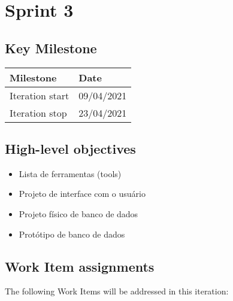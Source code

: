 \clearpage
\section{Sprint 3}

\subsection*{Key Milestone}


\noindent\begin{tabular}{|l|l|}
\hline
Milestone       & Date \\ \hline
Iteration start & 09/04/2021 \\ \hline
Iteration stop  & 23/04/2021 \\ \hline
\end{tabular}

\subsection*{High-level objectives}

\begin{itemize}
	\item Lista de ferramentas (tools)
	\item Projeto de interface com o usuário
	\item Projeto físico de banco de dados
	\item Protótipo de banco de dados
\end{itemize}

\subsection*{Work Item assignments}


The following Work Items will be addressed in this iteration:

